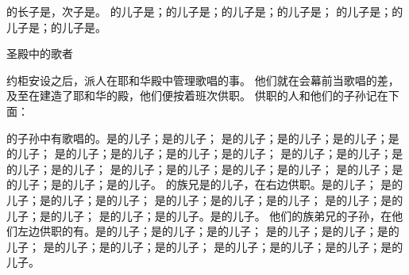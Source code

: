 {的长子是{}，次子是{}。
的儿子是{}；{}的儿子是{}；{}的儿子是{}；{}的儿子是{}；
的儿子是{}；{}的儿子是{}；{}的儿子是{}。
\par }{\SH 圣殿中的歌者
\par }{\PP {}约柜安设之后，{}派人在耶和华殿中管理歌唱的事。
他们就在会幕前当歌唱的差，及至{}在{}建造了耶和华的殿，他们便按着班次供职。
供职的人和他们的子孙记在下面：
\par }{的子孙中有歌唱的{}。{}是{}的儿子；{}是{}的儿子；
是{}的儿子；{}是{}的儿子；{}是{}的儿子；{}是{}的儿子；
是{}的儿子；{}是{}的儿子；{}是{}的儿子；{}是{}的儿子；
是{}的儿子；{}是{}的儿子；{}是{}的儿子；{}是{}的儿子；
是{}的儿子；{}是{}的儿子；{}是{}的儿子；{}是{}的儿子；
是{}的儿子；{}是{}的儿子；{}是{}的儿子；{}是{}的儿子。
的族兄{}是{}的儿子，{}在{}右边供职。{}是{}的儿子；
是{}的儿子；{}是{}的儿子；{}是{}的儿子；
是{}的儿子；{}是{}的儿子；{}是{}的儿子；
是{}的儿子；{}是{}的儿子；{}是{}的儿子；
是{}的儿子；{}是{}的儿子。{}是{}的儿子。
他们的族弟兄{}的子孙，在他们左边供职的有{}。{}是{}的儿子；{}是{}的儿子；{}是{}的儿子；
是{}的儿子；{}是{}的儿子；{}是{}的儿子；
是{}的儿子；{}是{}的儿子；{}是{}的儿子；
是{}的儿子；{}是{}的儿子；{}是{}的儿子；{}是{}的儿子。
}
